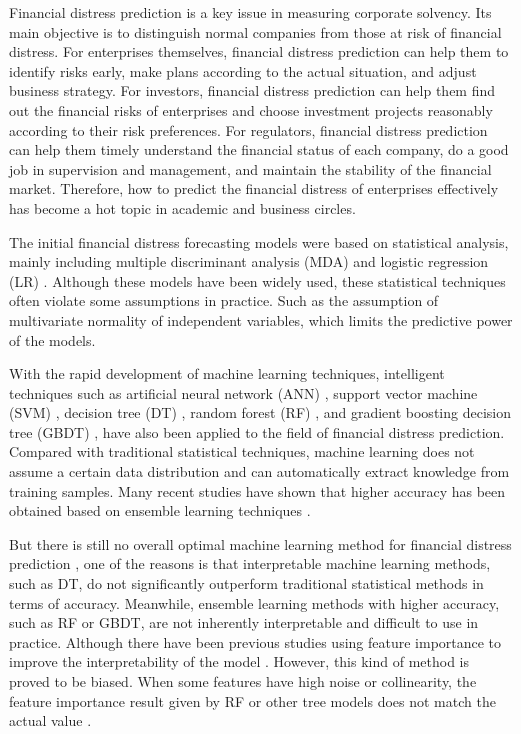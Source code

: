 \documentclass[review]{elsarticle}
\begin{document}
Financial distress prediction is a key issue in measuring corporate solvency. Its main objective is to distinguish normal companies from those at risk of financial distress. For enterprises themselves, financial distress prediction can help them to identify risks early, make plans according to the actual situation, and adjust business strategy. For investors, financial distress prediction can help them find out the financial risks of enterprises and choose investment projects reasonably according to their risk preferences. For regulators, financial distress prediction can help them timely understand the financial status of each company, do a good job in supervision and management, and maintain the stability of the financial market. Therefore, how to predict the financial distress of enterprises effectively has become a hot topic in academic and business circles\citep{Alaka2015, Altman2017, Qu2019}.

The initial financial distress forecasting models were based on statistical analysis, mainly including multiple discriminant analysis (MDA) \citep{Altman1968, Altman1977, casey1984corporate} and logistic regression (LR) \citep{Altman2007, Ohlson1980, Pantalone1987}. Although these models have been widely used, these statistical techniques often violate some assumptions in practice. Such as the assumption of multivariate normality of independent variables, which limits the predictive power of the models\citep{Begley1996}.

With the rapid development of machine learning techniques, intelligent techniques such as artificial neural network (ANN) \citep{Adisa2019, Atiya2001, West2000}, support vector machine (SVM) \citep{Ding2008, Fallahpour2017}, decision tree (DT) \citep{Khemakhem2018, Sun2008}, random forest (RF) \citep{Barboza2017, Teles2020}, and gradient boosting decision tree (GBDT) \citep{Son2019, Wyrobek2019, Xia2017, Zieba2016}, have also been applied to the field of financial distress prediction. Compared with traditional statistical techniques, machine learning does not assume a certain data distribution and can automatically extract knowledge from training samples. Many recent studies have shown that higher accuracy has been obtained based on ensemble learning techniques \citep{Alaka2018, Nanni2009, RaviKumar2007}.

But there is still no overall optimal machine learning method for financial distress prediction \citep{Alaka2018}, one of the reasons is that interpretable machine learning methods, such as DT, do not significantly outperform traditional statistical methods in terms of accuracy. Meanwhile, ensemble learning methods with higher accuracy, such as RF or GBDT, are not inherently interpretable and difficult to use in practice. Although there have been previous studies using feature importance to improve the interpretability of the model \citep{Huang2004, Son2019, Wyrobek2019, Xia2017}. However, this kind of method is proved to be biased. When some features have high noise or collinearity, the feature importance result given by RF or other tree models does not match the actual value \citep{Altmann2010}.
\end{document}
